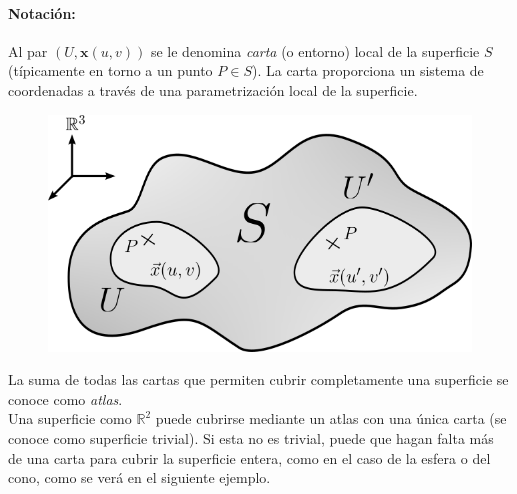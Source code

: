 \paragraph{Notación:} Al par $(U,\mathbf{x}(u,v))$ se le denomina \emph{carta} (o entorno) local de la superficie $S$ (típicamente en torno a un punto $P \in S$). La carta proporciona un sistema de coordenadas a través de una parametrización local de la superficie.
\newpage
\begin{figure}
    \centering
    \includegraphics[scale=.4]{FOTOS/carta.png}
\end{figure}

La suma de todas las cartas que permiten cubrir completamente una superficie se conoce como \emph{atlas}. \\

Una superficie como $\mathbb{R}^2$ puede cubrirse mediante un atlas con una única carta (se conoce como superficie trivial). Si esta no es trivial, puede que hagan falta más de una carta para cubrir la superficie entera, como en el caso de la esfera o del cono, como se verá en el siguiente ejemplo.\\

